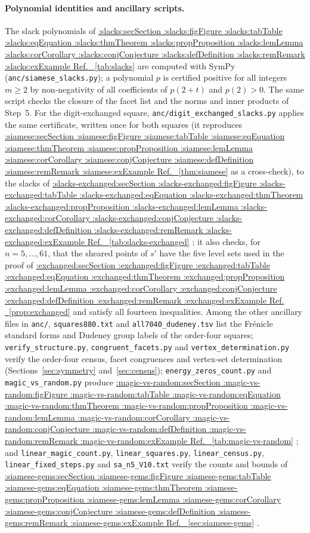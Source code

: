 \documentclass[11pt,a4paper]{article}
\makeatletter
\def\Cref@getprefix#1:#2\relax{#1}
\def\Cref@prefix@sec{sec}
\def\Cref@prefix@fig{fig}
\def\Cref@prefix@tab{tab}
\def\Cref@prefix@eq{eq}
\def\Cref@prefix@thm{thm}
\def\Cref@prefix@prop{prop}
\def\Cref@prefix@lem{lem}
\def\Cref@prefix@cor{cor}
\def\Cref@prefix@conj{conj}
\def\Cref@prefix@def{def}
\def\Cref@prefix@rem{rem}
\def\Cref@prefix@ex{ex}
\def\Cref@type@cap#1{%
  \edef\Cref@tmp{#1}%
  \ifx\Cref@tmp\Cref@prefix@sec Section%
  \else\ifx\Cref@tmp\Cref@prefix@fig Figure%
  \else\ifx\Cref@tmp\Cref@prefix@tab Table%
  \else\ifx\Cref@tmp\Cref@prefix@eq Equation%
  \else\ifx\Cref@tmp\Cref@prefix@thm Theorem%
  \else\ifx\Cref@tmp\Cref@prefix@prop Proposition%
  \else\ifx\Cref@tmp\Cref@prefix@lem Lemma%
  \else\ifx\Cref@tmp\Cref@prefix@cor Corollary%
  \else\ifx\Cref@tmp\Cref@prefix@conj Conjecture%
  \else\ifx\Cref@tmp\Cref@prefix@def Definition%
  \else\ifx\Cref@tmp\Cref@prefix@rem Remark%
  \else\ifx\Cref@tmp\Cref@prefix@ex Example%
  \else Ref.%
  \fi\fi\fi\fi\fi\fi\fi\fi\fi\fi\fi\fi
}
\DeclareRobustCommand{\Cref}[1]{%
  \begingroup
  \edef\Cref@label{#1}%
  \edef\Cref@prefix{\expandafter\Cref@getprefix\Cref@label:\relax}%
  \hyperref[#1]{\Cref@type@cap{\Cref@prefix}~\ref*{#1}}%
  \endgroup
}
\theoremstyle{plain}
\theoremstyle{definition}
\theoremstyle{remark}
\makeatother
\begin{document}
\paragraph{Polynomial identities and ancillary scripts.}
The slack polynomials of \Cref{tab:slacks} are computed with SymPy (\texttt{anc/siamese\_slacks.py}); a polynomial $p$ is certified positive for all integers $m\ge2$ by non-negativity of all coefficients of $p(2+t)$ and $p(2)>0$.
The same script checks the closure of the facet list and the norms and inner products of Step~5.
For the digit-exchanged square, \texttt{anc/digit\_exchanged\_slacks.py} applies the same certificate, written once for both squares (it reproduces \Cref{thm:siamese} as a cross-check), to the slacks of \Cref{tab:slacks-exchanged}; it also checks, for $n=5,\dots,61$, that the sheared points of $s'$ have the five level sets used in the proof of \Cref{prop:exchanged} and satisfy all fourteen inequalities.
Among the other ancillary files in \texttt{anc/}, \texttt{squares880.txt} and \texttt{all7040\_dudeney.tsv} list the Fr\'enicle standard forms and Dudeney group labels of the order-four squares; \texttt{verify\_structure.py}, \texttt{congruent\_facets.py} and \texttt{vertex\_determination.py} verify the order-four census, facet congruences and vertex-set determination (Sections~\ref{sec:symmetry} and~\ref{sec:census}); \texttt{energy\_zeros\_count.py} and \texttt{magic\_vs\_random.py} produce \Cref{tab:magic-vs-random}; and \texttt{linear\_magic\_count.py}, \texttt{linear\_squares.py}, \texttt{linear\_census.py}, \texttt{linear\_fixed\_steps.py} and \texttt{sa\_n5\_V10.txt} verify the counts and bounds of \Cref{sec:siamese-gems}.
\end{document}
